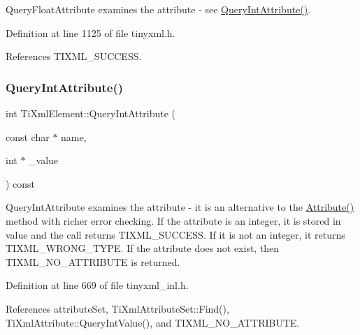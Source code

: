 Query\+Float\+Attribute examines the attribute -\/ see \hyperlink{class_ti_xml_element_a5c0f739e0f6f5905a201364532e54a60}{Query\+Int\+Attribute()}. 



Definition at line 1125 of file tinyxml.\+h.



References T\+I\+X\+M\+L\+\_\+\+S\+U\+C\+C\+E\+SS.

\hypertarget{class_ti_xml_element_a5c0f739e0f6f5905a201364532e54a60}{}\label{class_ti_xml_element_a5c0f739e0f6f5905a201364532e54a60} 
\subsubsection{\texorpdfstring{Query\+Int\+Attribute()}{QueryIntAttribute()}\hspace{0.1cm}{\footnotesize\ttfamily [1/2]}}
{\footnotesize\ttfamily int Ti\+Xml\+Element\+::\+Query\+Int\+Attribute (\begin{DoxyParamCaption}\item[{const char $\ast$}]{name,  }\item[{int $\ast$}]{\+\_\+value }\end{DoxyParamCaption}) const}

Query\+Int\+Attribute examines the attribute -\/ it is an alternative to the \hyperlink{class_ti_xml_element_a6042f518748f475a7ac4b4e0b509eb05}{Attribute()} method with richer error checking. If the attribute is an integer, it is stored in \textquotesingle{}value\textquotesingle{} and the call returns T\+I\+X\+M\+L\+\_\+\+S\+U\+C\+C\+E\+SS. If it is not an integer, it returns T\+I\+X\+M\+L\+\_\+\+W\+R\+O\+N\+G\+\_\+\+T\+Y\+PE. If the attribute does not exist, then T\+I\+X\+M\+L\+\_\+\+N\+O\+\_\+\+A\+T\+T\+R\+I\+B\+U\+TE is returned. 

Definition at line 669 of file tinyxml\+\_\+inl.\+h.



References attribute\+Set, Ti\+Xml\+Attribute\+Set\+::\+Find(), Ti\+Xml\+Attribute\+::\+Query\+Int\+Value(), and T\+I\+X\+M\+L\+\_\+\+N\+O\+\_\+\+A\+T\+T\+R\+I\+B\+U\+TE.

\hypertarget{class_ti_xml_element_aa368685cfa6efae820b8e7ec18114865}{}\label{class_ti_xml_element_aa368685cfa6efae820b8e7ec18114865} 
